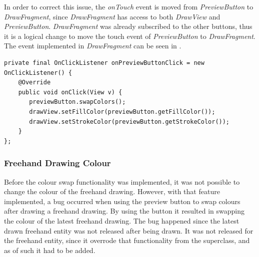 In order to correct this issue, the \textit{onTouch} event is moved from \textit{PreviewButton} to \textit{DrawFragment}, since \textit{DrawFragment} has access to both \textit{DrawView} and \textit{PreviewButton}.
\textit{DrawFragment} was already subscribed to the other buttons, thus it is a logical change to move the touch event of \textit{PreviewButton} to \textit{DrawFragment}.
The event implemented in \textit{DrawFragment} can be seen in .

\begin{lstlisting}[caption={onPreviewButtonClick event},label=lst:event-previewbuttonclick]
private final OnClickListener onPreviewButtonClick = new OnClickListener() {
    @Override
    public void onClick(View v) {
       previewButton.swapColors();
       drawView.setFillColor(previewButton.getFillColor());
       drawView.setStrokeColor(previewButton.getStrokeColor());
    }
};
\end{lstlisting}


\subsubsection{Freehand Drawing Colour}
Before the colour swap functionality was implemented, it was not possible to change the colour of the freehand drawing.
However, with that feature implemented, a bug occurred when using the preview button to swap colours after drawing a freehand drawing. 
By using the button it resulted in swapping the colour of the latest freehand drawing. 
The bug happened since the latest drawn freehand entity was not released after being drawn.
It was not released for the freehand entity, since it overrode that functionality from the superclass, and as of such it had to be added.